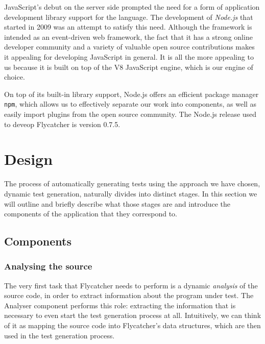 JavaScript's debut on the server side prompted the need for a form of application development library support for the language. The development of \emph{Node.js} that started in 2009 was an attempt to satisfy this need. Although the framework is intended as an event-driven web framework, the fact that it has a strong online developer community and a variety of valuable open source contributions makes it appealing for developing JavaScript in general. It is all the more appealing to us because it is built on top of the V8 JavaScript engine, which is our engine of choice.

On top of its built-in library support, Node.js offers an efficient package manager \texttt{npm}, which allows us to effectively separate our work into components, as well as easily import plugins from the open source community. The Node.js release used to deveop \textsf{Flycatcher} is version 0.7.5.


\section{Design}
The process of automatically generating tests using the approach we have chosen, dynamic test generation, naturally divides into distinct stages. In this section we will outline and briefly describe what those stages are and introduce the components of the application that they correspond to.

\subsection{Components}
\subsubsection{Analysing the source}
The very first task that \textsf{Flycatcher} needs to perform is a dynamic \emph{analysis} of the source code, in order to extract information about the program under test. The \textsf{Analyser} component performs this role: extracting the information that is necessary to even start the test generation process at all. Intuitively, we can think of it as mapping the source code into \textsf{Flycatcher}'s data structures, which are then used in the test generation process.

